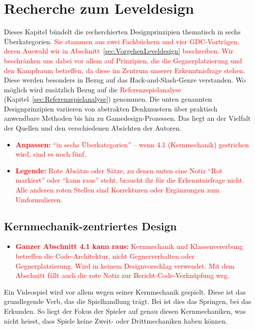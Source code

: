 \documentclass[../Main.tex]{subfiles}
\begin{document}
\section{Recherche zum Leveldesign} \label{sec:Leveldesign}
Dieses Kapitel bündelt die recherchierten Designprinzipien thematisch in sechs Überkategorien. \textcolor{red}{Sie stammen aus zwei Fachbüchern und vier GDC-Vorträgen, deren Auswahl wir in Abschnitt~\ref{sec:VorgehenLeveldesign} beschreiben. Wir beschränken uns dabei vor allem auf Prinzipien, die die Gegnerplatzierung und den Kampfraum betreffen, da diese im Zentrum unserer Erkenntnisfrage stehen.} Diese werden besonders in Bezug auf das Hack-and-Slash-Genre verstanden. Wo möglich wird zusätzlich Bezug auf die \textcolor{red}{Referenzspielanalyse} (Kapitel~\ref{sec:Referenzspielanalyse}) genommen. Die unten genannten Designprinzipien variieren von abstrakten Denkmustern über praktisch anwendbare Methoden bis hin zu Gamedesign-Prozessen. Das liegt an der Vielfalt der Quellen und den verschiedenen Absichten der Autoren.
\begin{itemize}[leftmargin=1.5cm]
    \item \textcolor{red}{\textbf{Anpassen:} \enquote{in sechs Überkategorien} -- wenn 4.1 (Kernmechanik) gestrichen wird, sind es noch fünf.}
    \item \textcolor{red}{\textbf{Legende:} Rote Absätze oder Sätze, zu denen unten eine Notiz \enquote{Rot markiert} oder \enquote{kann raus} steht, braucht ihr für die Erkenntnisfrage nicht. Alle anderen roten Stellen sind Korrekturen oder Ergänzungen zum Umformulieren.}
\end{itemize}

\subsection{Kernmechanik-zentriertes Design} \label{sec:Kernmechanik}

\begin{itemize}[leftmargin=1.5cm]
    \item \textcolor{red}{\textbf{Ganzer Abschnitt 4.1 kann raus:} Kernmechanik und Klassenvererbung betreffen die Code-Architektur, nicht Gegnerverhalten oder Gegnerplatzierung. Wird in keinem Designvorschlag verwendet. Mit dem Abschnitt fällt auch die rote Notiz zur Bericht-Code-Verknüpfung weg.}
\end{itemize}
\begingroup\color{red}Ein Videospiel wird vor allem wegen seiner Kernmechanik gespielt. Diese ist das grundlegende Verb, das die Spielhandlung trägt.\autocite[110]{totten2014architectural} Bei  ist dies das Springen, bei  das Erkunden.\autocite{nintendo_supermariobros_1985,nintendo_zelda_1986} So liegt der Fokus der Spieler auf genau diesen Kernmechaniken, was nicht heisst, dass Spiele keine Zweit- oder Drittmechaniken haben können.
\end{document}
